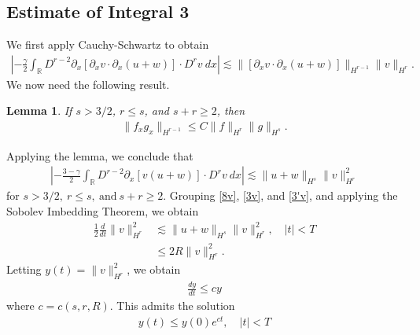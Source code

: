 \documentclass[12pt,reqno]{amsart}
\numberwithin{equation}{section}  %
\numberwithin{figure}{section}
\newcommand{\rr}{\mathbb{R}}
\newcommand{\p}{\partial}
\newtheorem{lemma}[theorem]{Lemma}
\begin{document}
\subsection{Estimate of Integral 3} We first apply
Cauchy-Schwartz to obtain
%
%
\begin{equation*}
\begin{split}
\left | - \frac{\gamma}{2} \int_{\rr} D^{r 
-2} \p_x [ \p_x v
\cdot \p_x (u+w)]\cdot D^r v \ dx \right | 
 \lesssim 
\|[\p_x v \cdot \p_x (u+w)] \|_{H^{r -1}}
\|v\|_{H^r}.
\end{split}
\end{equation*}
%
We now need the following result.
%
%
%
\begin{lemma}
\label{impo}
If  $s > 3/2$, $r \le s$, and $s + r \ge 2$,  then
%
%
\begin{equation}
\begin{split}
  \|f_{x}g_{x}\|_{H^{r - 1}} \le C \|f\|_{H^{r}}
\|g\|_{H^{s}}.
\label{11}
\end{split}
\end{equation}
%
%
\end{lemma}
%
Applying the lemma, we conclude that
%
\begin{equation}
\begin{split}
\left | - \frac{3-\gamma}{2} \int_{\rr}  D^{r -2}
\p_x[v(u+w)] \cdot
D^r v \ dx  \right |
 \lesssim \|u+w \|_{H^{s}}
\|v\|_{H^r}^2
\label{3'v}
\end{split}
\end{equation}
%
%
for $s > 3/2, \ r \le s, \ \text{and} \ s + r \ge 2$.
%
%
%
%
Grouping \eqref{8v}, \eqref{3v}, and \eqref{3'v}, and 
applying
the Sobolev Imbedding Theorem, we obtain
%
%
\begin{equation}
\begin{split}
\frac{1}{2} \frac{d}{dt}
\|v\|_{H^r}^2
& \lesssim \|u+w\|_{H^s}
\|v\|_{H^r}^2, \quad | t | < T
\\
& \le 2R \| v \|_{H^{r}}^{2}.
\label{9v}
\end{split}
\end{equation}
%
%
%
%
%
Letting $y(t) = \| v \|^{2}_{H^{r}}$, we obtain
%
%
%
\begin{equation*}
\begin{split}
  \frac{dy}{dt} \le cy
\end{split}
\end{equation*}
%
where $c = c(s, r, R)$. 
This admits the solution
%
%
\begin{equation*}
\begin{split}
  y(t) \le y(0) e^{ct}, \quad | t | < T
\end{split}
\end{equation*}
\end{document}
